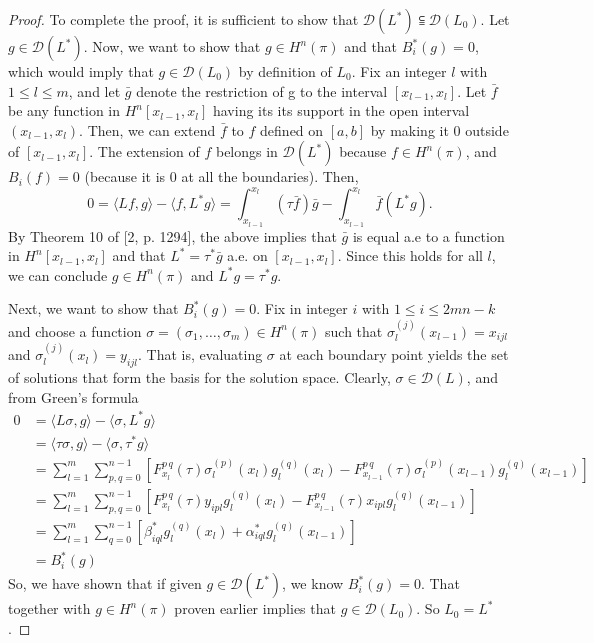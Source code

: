 \documentclass[11pt,reqno,oneside,a4paper]{article}
\begin{document}
\begin{proof}
		To complete the proof, it is sufficient to show that $\mathcal{D}(L^*) \subseteqq \mathcal{D}(L_0)$. Let $g \in \mathcal{D}(L^*)$. Now, we want to show that $g \in H^n(\pi)$ and that $B_i^*(g) = 0$, which would imply that $g \in \mathcal{D}(L_0)$ by definition of $L_0$. Fix an integer $l$ with $1 \leq l \leq m$, and let $\bar{g}$ denote the restriction of g to the interval $[x_{l-1}, x_l].$ Let $\bar{f}$ be any function in $H^n[x_{l-1},x_l]$ having its its support in the open interval $(x_{l-1},x_l)$. 
		Then, we can extend $\bar{f}$ to $f$ defined on $[a,b]$ by making it 0 outside of $[x_{l-1},x_l]$. The extension of $f$ belongs in $\mathcal{D}(L^*)$ because $f \in H^n(\pi)$, and $B_i(f) = 0$ (because it is 0 at all the boundaries). Then,
		$$ 0 = \langle Lf,g\rangle - \langle f, L^*g\rangle = \int_{x_{l-1}}^{x_l}(\tau\bar{f})\bar{g} - \int_{x_{l-1}}^{x_l}\bar{f}(L^*g).$$
		By Theorem 10 of [2, p. 1294], the above implies that $\bar{g}$ is equal a.e to a function in $H^n[x_{l-1},x_l]$ and that $L^* = \tau^*\bar{g}$ a.e. on $[x_{l-1},x_l]$. Since this holds for all $l$, we can conclude $g\in H^n(\pi)$ and $L^*g=\tau^*g$. 
		
		Next, we want to show that $B_i^*(g) = 0$. Fix in integer $i$ with $1\leq i \leq 2mn-k$ and choose a function $\sigma = (\sigma_1,\dots, \sigma_m) \in H^n(\pi)$ such that $\sigma_l^{(j)}(x_{l-1}) = x_{ijl}$ and $\sigma_l^{(j)}(x_{l}) = y_{ijl}$. That is, evaluating $\sigma$ at each boundary point yields the set of solutions that form the basis for the solution space. Clearly, $\sigma \in \mathcal{D}(L)$, and from Green's formula
		\begin{align*}
		     0 &= \langle L\sigma,g\rangle - \langle \sigma, L^*g\rangle\\
		     &= \langle \tau\sigma,g\rangle - \langle \sigma, \tau^*g\rangle\\
		     &= \sum_{l=1}^{m}\sum_{p,q=0}^{n-1}[F_{x_l}^{p\,q}(\tau)\sigma_l^{(p)}(x_l)g_l^{(q)}(x_l)
		     - F_{x_{l-1}}^{p\,q}(\tau)\sigma_l^{(p)}(x_{l-1})g_l^{(q)}(x_{l-1})]\\
		     &= \sum_{l=1}^{m}\sum_{p,q=0}^{n-1}[F_{x_l}^{p\,q}(\tau)y_{ipl}g_l^{(q)}(x_l)
		     - F_{x_{l-1}}^{p\,q}(\tau)x_{ipl}g_l^{(q)}(x_{l-1})]\\
		     &= \sum_{l=1}^{m}\sum_{q=0}^{n-1}[\beta_{iql}^*g_l^{(q)}(x_l) + \alpha_{iql}^*g_l^{(q)}(x_{l-1})]\\
		     &= B_i^*(g) 
		\end{align*}
		So, we have shown that if given $g \in \mathcal{D}(L^*)$, we know $B_i^*(g) = 0$. That together with $g \in H^n(\pi)$ proven earlier implies that $g \in \mathcal{D}(L_0)$. So $L_0 = L^*$.
	\end{proof}
\end{document}
